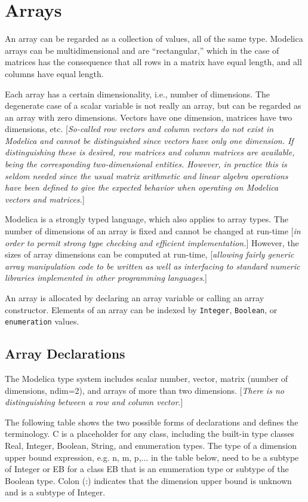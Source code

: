 \chapter{Arrays}

An array can be regarded as a collection of values, all of the same
type. Modelica arrays can be multidimensional and are ``rectangular,''
which in the case of matrices has the consequence that all rows in a
matrix have equal length, and all columns have equal length.

Each array has a certain dimensionality, i.e., number of dimensions. The
degenerate case of a scalar variable is not really an array, but can be
regarded as an array with zero dimensions. Vectors have one dimension,
matrices have two dimensions, etc. {[}\emph{So-called row vectors and
column vectors do not exist in Modelica and cannot be distinguished
since vectors have only one dimension. If distinguishing these is
desired, row matrices and column matrices are available, being the
corresponding two-dimensional entities. However, in practice this is
seldom needed since the usual matrix arithmetic and linear algebra
operations have been defined to give the expected behavior when
operating on Modelica vectors and matrices.}{]}

Modelica is a strongly typed language, which also applies to array
types. The number of dimensions of an array is fixed and cannot be
changed at run-time {[}\emph{in order to permit strong type checking and
efficient implementation.}{]} However, the sizes of array dimensions can
be computed at run-time, {[}\emph{allowing fairly generic array
manipulation code to be written as well as interfacing to standard
numeric libraries implemented in other programming languages}.{]}

An array is allocated by declaring an array variable or calling an array
constructor. Elements of an array can be indexed by \lstinline!Integer!, \lstinline!Boolean!, or
\lstinline!enumeration! values.

\section{Array Declarations}

The Modelica type system includes scalar number, vector, matrix (number
of dimensions, ndim=2), and arrays of more than two dimensions.
{[}\emph{There is no distinguishing between a row and column vector}.{]}

The following table shows the two possible forms of declarations and
defines the terminology. C is a placeholder for any class, including the
built-in type classes Real, Integer, Boolean, String, and enumeration
types. The type of a dimension upper bound expression, e.g. n, m, p,...
in the table below, need to be a subtype of Integer or EB for a class EB
that is an enumeration type or subtype of the Boolean type. Colon (:)
indicates that the dimension upper bound is unknown and is a subtype of
Integer.

